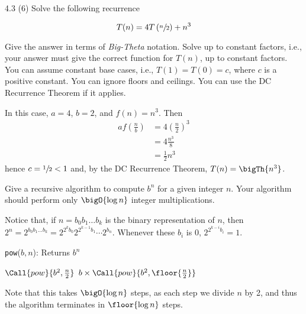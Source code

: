 \documentclass[final]{article}
\begin{document}
\begin{exercise}{4.3 (6)}
    Solve the following recurrence

    \[T(n) = 4 T\left(\sfrac{n}{2}\right) + n^3\]

    Give the answer in terms of \emph{Big-Theta} notation. Solve up to constant
    factors, i.e., your answer must give the correct function for $T(n)$, up to constant factors.
    You can assume constant base cases, i.e., $T(1) = T(0) = c$, where $c$ is a positive constant.
    You can ignore floors and ceilings. You can use the DC Recurrence Theorem if it applies.
\end{exercise}

\begin{solution}
    In this case, $a = 4$, $b = 2$, and $f(n) = n^3$. Then
    \begin{align*}af\left(\frac{n}{b}\right)
         & = 4\left(\frac{n}{2}\right)^3 \\
         & = 4\frac{n^3}{8}              \\
         & = \frac{1}{2}n^3
    \end{align*}
    hence $c = \sfrac{1}{2} < 1$ and, by the DC Recurrence Theorem, $T(n) = \bigTh{n^3}$.
\end{solution}

\begin{exercise}{4.8}
    Give a recursive algorithm to compute $b^n$ for a given integer $n$.
    Your algorithm should perform only $\bigO{\log{n}}$ integer multiplications.
\end{exercise}

\begin{solution}
    Notice that, if \(n = b_0b_1\hdots b_k\) is the binary representation of \(n\), then \(2^n=2^{b_0b_1\hdots b_k}=2^{2^k b_0}2^{2^{k - 1}b_1}\cdots 2^{b_n}\). Whenever these \(b_i\) is 0, \(2^{2^{k - i} b_i} = 1\).
    \begin{algorithm}[H]
        \renewcommand{\thealgorithm}{}
        \begin{algorithmic}[1]
            \caption{\texttt{pow}(\(b, n\)): Returns \(b^n\)}
            \State {}
            \Else
            \State \Return $\Call{pow}{b^2, \frac{n}{2}}$
            \Else
            \State \Return $b \times \Call{pow}{b^2, \floor{\frac{n}{2}}}$
            \EndIf
            \EndIf
            \EndProcedure
        \end{algorithmic}
    \end{algorithm}

    Note that this takes \(\bigO{\log{n}}\) steps, as each step we divide \(n\) by 2, and thus the algorithm terminates in $\floor{\log{n}}$ steps.
\end{solution}
\end{document}
